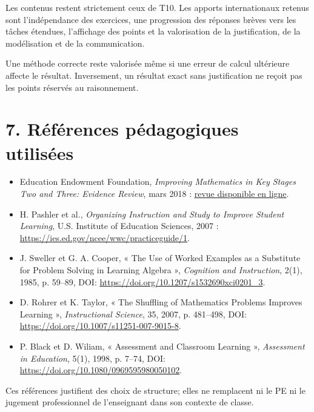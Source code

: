 Les contenus restent strictement ceux de T10. Les apports internationaux retenus
sont l'indépendance des exercices, une progression des réponses brèves vers les
tâches étendues, l'affichage des points et la valorisation de la justification,
de la modélisation et de la communication.


Une méthode correcte reste valorisée même si une erreur de calcul ultérieure
affecte le résultat. Inversement, un résultat exact sans justification ne reçoit
pas les points réservés au raisonnement.

\section*{7. Références pédagogiques utilisées}

\begin{itemize}
  \item Education Endowment Foundation, \emph{Improving Mathematics in Key Stages
  Two and Three: Evidence Review}, mars 2018 :
  \href{https://educationendowmentfoundation.org.uk/education-evidence/evidence-reviews/mathematics-in-key-stages-2-and-3}{revue disponible en ligne}.
  \item H. Pashler et al., \emph{Organizing Instruction and Study to Improve
  Student Learning}, U.S. Institute of Education Sciences, 2007 :
  \url{https://ies.ed.gov/ncee/wwc/practiceguide/1}.
  \item J. Sweller et G. A. Cooper, « The Use of Worked Examples as a Substitute
  for Problem Solving in Learning Algebra », \emph{Cognition and Instruction},
  2(1), 1985, p. 59--89, DOI: \url{https://doi.org/10.1207/s1532690xci0201_3}.
  \item D. Rohrer et K. Taylor, « The Shuffling of Mathematics Problems Improves
  Learning », \emph{Instructional Science}, 35, 2007, p. 481--498,
  DOI: \url{https://doi.org/10.1007/s11251-007-9015-8}.
  \item P. Black et D. Wiliam, « Assessment and Classroom Learning »,
  \emph{Assessment in Education}, 5(1), 1998, p. 7--74,
  DOI: \url{https://doi.org/10.1080/0969595980050102}.
\end{itemize}

Ces références justifient des choix de structure; elles ne remplacent ni le PE
ni le jugement professionnel de l'enseignant dans son contexte de classe.

